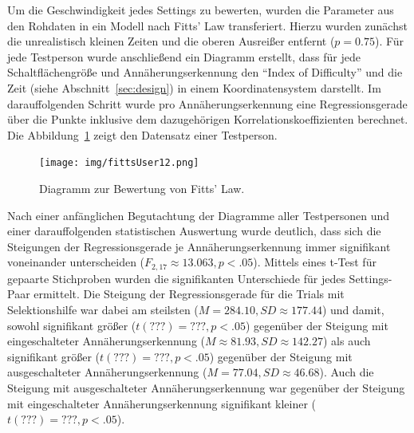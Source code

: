 \documentclass[12pt,numbers=noenddot,parskip,bibliography=totocnumbered,listof=totocnumbered]{scrreprt}
\begin{document}
Um die Geschwindigkeit jedes Settings zu bewerten, wurden die Parameter aus den Rohdaten in ein Modell nach Fitts' Law transferiert. Hierzu wurden zunächst die unrealistisch kleinen Zeiten und die oberen Ausreißer entfernt ($p = 0.75$). Für jede Testperson wurde anschließend ein Diagramm erstellt, dass für jede Schaltflächengröße und Annäherungserkennung den "`Index of Difficulty"' und die Zeit (siehe Abschnitt~\ref{sec:design}) in einem Koordinatensystem darstellt. Im darauffolgenden Schritt wurde pro Annäherungserkennung eine Regressionsgerade über die Punkte inklusive dem dazugehörigen Korrelationskoeffizienten berechnet. Die Abbildung~\ref{ergebnistest2fitts} zeigt den Datensatz einer Testperson.
\begin{figure}
\centering
\texttt{[image: img/fittsUser12.png]}
\caption{Diagramm zur Bewertung von Fitts' Law.}
\label{ergebnistest2fitts}
\end{figure}
Nach einer anfänglichen Begutachtung der Diagramme aller Testpersonen und einer darauffolgenden statistischen Auswertung wurde deutlich, dass sich die Steigungen der Regressionsgerade je Annäherungserkennung immer signifikant voneinander unterscheiden ($F_{2,17}\approx 13.063, p < .05$). Mittels eines t-Test für gepaarte Stichproben wurden die signifikanten Unterschiede für jedes Settings-Paar ermittelt. Die Steigung der Regressionsgerade für die Trials mit Selektionshilfe war dabei am steilsten ($M = 284.10, SD \approx 177.44$) und damit, sowohl signifikant größer ($t(???) =??? , p < .05$) gegenüber der Steigung mit eingeschalteter Annäherungserkennung ($M \approx 81.93, SD \approx 142.27$) als auch signifikant größer ($t(???) =??? , p < .05$) gegenüber der Steigung mit ausgeschalteter Annäherungserkennung ($M = 77.04, SD \approx 46.68$). Auch die Steigung mit ausgeschalteter Annäherungserkennung war gegenüber der Steigung mit eingeschalteter Annäherungserkennung signifikant kleiner ($t(???) =??? , p < .05$).
\end{document}
